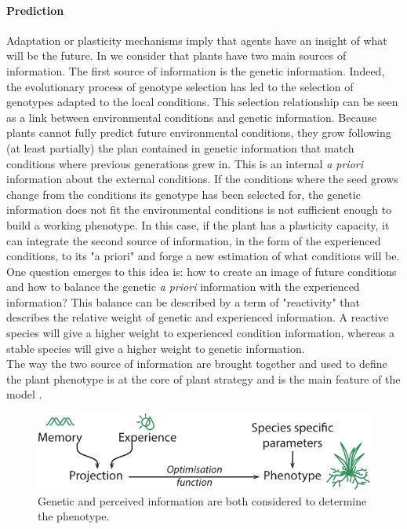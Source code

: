 \paragraph{Prediction} Adaptation or plasticity mechanisms imply that agents have an insight of what will be the future. In \model we consider that plants have two main sources of information. The first source of information is the genetic information. Indeed, the evolutionary process of genotype selection has led to the selection of genotypes adapted to the local conditions. This selection relationship can be seen as a link between environmental conditions and genetic information. Because plants cannot fully predict future environmental conditions, they grow following (at least partially) the plan contained in genetic information that match conditions where previous generations grew in.  This is an internal \textit{a priori} information about the external conditions. If the conditions where the seed grows change from the conditions its genotype has been selected for, the genetic information does not fit the environmental conditions is not sufficient enough to build a working phenotype. In this case, if the plant has a plasticity capacity, it can integrate the second source of information, in the form of the experienced conditions, to its "a priori" and forge a new estimation of what conditions will be. One question emerges to this idea is: how to create an image of future conditions and how to balance the genetic \textit{a priori} information with the experienced information? This balance can be described by a term of "reactivity" that describes the relative weight of genetic and experienced information. A reactive species will give a higher weight to experienced condition information, whereas a stable species will give a higher weight to genetic information.\\
\indent The way the two source of information are brought together and used to define the plant phenotype is at the core of plant strategy and is the main feature of the model \model.
\begin{figure}
\includegraphics{./Figures/memory2phenotype_t.pdf}
\caption{Genetic and perceived information are both considered to determine the phenotype.}
\end{figure}
